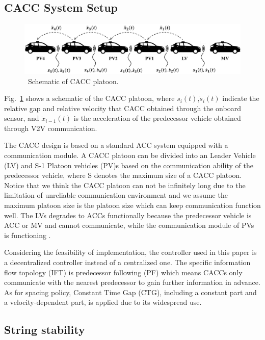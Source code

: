 \documentclass[a4paper,fleqn]{cas-sc}
\begin{document}
\subsection{CACC System Setup}
\label{Section 2.1}

\begin{figure}
  \centering
  \includegraphics[width=14cm]{figs/fig1.png}
  \caption{~Schematic of CACC platoon.}
  \label{fig1}
\end{figure}

Fig.~\ref{fig1} shows a schematic of the CACC platoon, where $s_i (t)$,$\dot{s}_{i} (t)$ indicate the relative gap and relative velocity that CACC obtained through the onboard sensor, and $\ddot{x}_{i-1} (t)$ is the acceleration of the predecessor vehicle obtained through V2V communication.

The CACC design is based on a standard ACC system equipped with a communication module. A CACC platoon can be divided into an Leader Vehicle (LV) and S-1 Platoon vehicles (PV)s based on the communication ability of the predecessor vehicle, where S denotes the maximum size of a CACC platoon. Notice that we think the CACC platoon can not be infinitely long due to the limitation of unreliable communication environment and we assume the maximum platoon size is the platoon size which can keep communication function well. The LVs degrades to ACCs functionally because the predecessor vehicle is ACC or MV and cannot communicate, while the communication module of PVs is functioning \citep{dey2015review,navas2019mixing}.

Considering the feasibility of implementation, the controller used in this paper is a decentralized controller instead of a centralized one. The specific information flow topology (IFT) is predecessor following (PF) which means CACCs only communicate with the nearest predecessor to gain further information in advance. As for spacing policy, Constant Time Gap (CTG), including a constant part and a velocity-dependent part, is applied due to its widespread use.

\subsection{String stability}
\label{Section 2.2}
\end{document}
